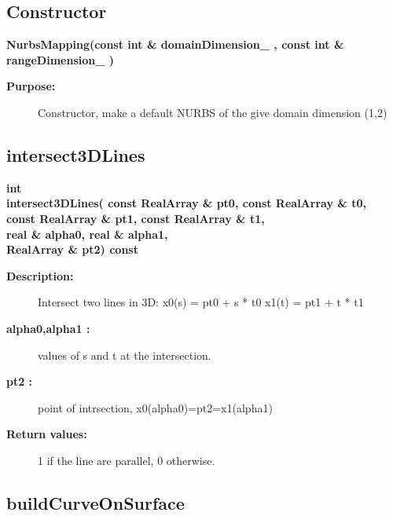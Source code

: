 \subsection{Constructor}
 
\begin{flushleft} \textbf{%
\settowidth{\NurbsMappingIncludeArgIndent}{NurbsMapping(}%
NurbsMapping(const int \& domainDimension\_ , const int \& rangeDimension\_ ) 
}\end{flushleft}
\begin{description}
\item[{\bf Purpose:}]  Constructor, make a default NURBS of the give domain dimension (1,2)
\end{description}
\subsection{intersect3DLines}
 
\begin{flushleft} \textbf{%
int  \\ 
\settowidth{\NurbsMappingIncludeArgIndent}{intersect3DLines(}%
intersect3DLines( const RealArray \& pt0, const RealArray \&  t0, \\ 
\hspace{\NurbsMappingIncludeArgIndent}const RealArray \& pt1, const RealArray \& t1,\\ 
\hspace{\NurbsMappingIncludeArgIndent}real \& alpha0, real \& alpha1,\\ 
\hspace{\NurbsMappingIncludeArgIndent}RealArray \& pt2) const
}\end{flushleft}
\begin{description}
\item[{\bf Description:}] 
    Intersect two lines in 3D:
 x0(s) = pt0 + s * t0
 x1(t) = pt1 + t * t1

\item[{\bf alpha0,alpha1 :}]  values of s and t at the intersection.
\item[{\bf pt2 :}]  point of intrsection, x0(alpha0)=pt2=x1(alpha1)

\item[{\bf Return values:}]  1 if the line are parallel, 0 otherwise.
\end{description}
\subsection{buildCurveOnSurface}
 
